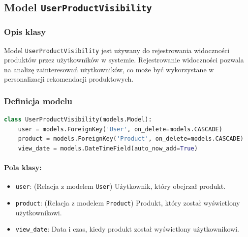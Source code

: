 \documentclass[12pt,a4paper,oneside]{article}
\theoremstyle{definition}
\numberwithin{equation}{section}
\begin{document}
% 
% 
\clearpage
\subsection{Model \texttt{UserProductVisibility}}
\subsubsection{Opis klasy}
Model \texttt{UserProductVisibility} jest używany do rejestrowania widoczności produktów przez użytkowników w systemie. Rejestrowanie widoczności pozwala na analizę zainteresowań użytkowników, co może być wykorzystane w personalizacji rekomendacji produktowych.

\subsubsection{Definicja modelu}
\begin{lstlisting}[language=Python, caption={Model \texttt{UserProductVisibility}}]
class UserProductVisibility(models.Model):
    user = models.ForeignKey('User', on_delete=models.CASCADE)
    product = models.ForeignKey('Product', on_delete=models.CASCADE)
    view_date = models.DateTimeField(auto_now_add=True)
\end{lstlisting}

\paragraph{Pola klasy:}
\begin{itemize}
    \item \texttt{user}: (Relacja z modelem \texttt{User}) Użytkownik, który obejrzał produkt.
    \item \texttt{product}: (Relacja z modelem \texttt{Product}) Produkt, który został wyświetlony użytkownikowi.
    \item \texttt{view\_date}: Data i czas, kiedy produkt został wyświetlony użytkownikowi.
\end{itemize}
\end{document}
